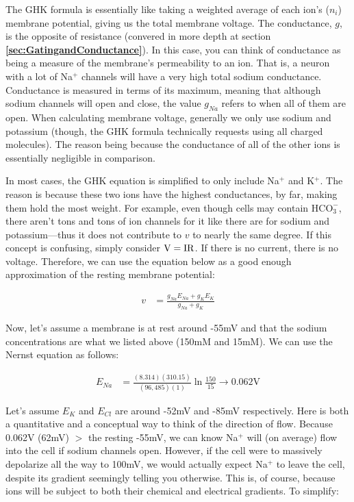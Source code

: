 The GHK formula is essentially like taking a weighted average of each ion's ($n_i$) membrane potential, giving us the total membrane voltage. The conductance, $g$, is the opposite of resistance (convered in more depth at section \textbf{\ref{sec:GatingandConductance}}). In this case, you can think of conductance as being a measure of the membrane's permeability to an ion. That is, a neuron with a lot of Na$^+$ channels will have a very high total sodium conductance. Conductance is measured in terms of its maximum, meaning that although sodium channels will open and close, the value $g_{Na}$ refers to when all of them are open. When calculating membrane voltage, generally we only use sodium and potassium (though, the GHK formula technically requests using all charged molecules). The reason being because the conductance of all of the other ions is essentially negligible in comparison.\newline

In most cases, the GHK equation is simplified to only include Na$^+$ and K$^+$. The reason is because these two ions have the highest conductances, by far, making them hold the most weight. For example, even though cells may contain $\mathrm{HCO}_3^-$, there aren't tons and tons of ion channels for it like there are for sodium and potassium---thus it does not contribute to $v$ to nearly the same degree. If this concept is confusing, simply consider ${\rm V} = \mathrm{IR}$. If there is no current, there is no voltage. Therefore, we can use the equation below as a good enough approximation of the resting membrane potential:

\begin{equation} \label{GHK2}
\begin{split}
v &= \frac{g_{Na}E_{Na} + g_{K}E_{K}}{g_{Na} + g_{K}}
\end{split}
\end{equation}

Now, let's assume a membrane is at rest around -55mV and that the sodium concentrations are what we listed above (150mM and 15mM). We can use the Nernst equation as follows: 

\begin{equation} \label{Nernst1}
\begin{split}
E_{Na} &= \frac{(8.314)(310.15)}{(96,485)(1)}\ln\frac{150}{15} \rightarrow 0.062\mathrm{V}
\end{split}
\end{equation}

Let's assume $E_K$ and $E_{Cl}$ are around -52mV and -85mV respectively. Here is both a quantitative and a conceptual way to think of the direction of flow. Because 0.062V (62mV) $>$ the resting -55mV, we can know Na$^+$ will (on average) flow into the cell if sodium channels open. However, if the cell were to massively depolarize all the way to 100mV, we would actually expect Na$^+$ to leave the cell, despite its gradient seemingly telling you otherwise. This is, of course, because ions will be subject to both their chemical and electrical gradients. To simplify:


